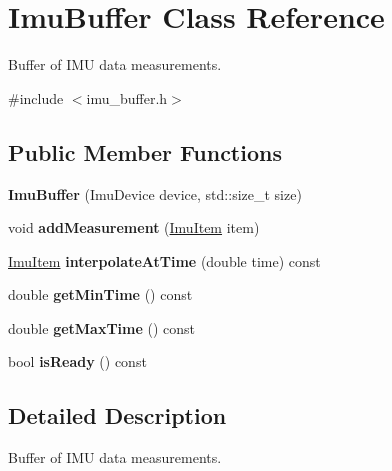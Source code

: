 \hypertarget{class_imu_buffer}{\section{Imu\-Buffer Class Reference}
\label{class_imu_buffer}
}


Buffer of I\-M\-U data measurements.  




{\ttfamily \#include $<$imu\-\_\-buffer.\-h$>$}

\subsection*{Public Member Functions}
\begin{DoxyCompactItemize}
\item 
\hypertarget{class_imu_buffer_a50dd06412b4e7f3f041ae6ab6fa680b0}{{\bfseries Imu\-Buffer} (Imu\-Device device, std\-::size\-\_\-t size)}\label{class_imu_buffer_a50dd06412b4e7f3f041ae6ab6fa680b0}

\item 
\hypertarget{class_imu_buffer_a03aff5b4ab113232a3fa032115249018}{void {\bfseries add\-Measurement} (\hyperlink{class_imu_item}{Imu\-Item} item)}\label{class_imu_buffer_a03aff5b4ab113232a3fa032115249018}

\item 
\hypertarget{class_imu_buffer_a70e3b571c1ff9c9e2ca60c8dfd1eee1c}{\hyperlink{class_imu_item}{Imu\-Item} {\bfseries interpolate\-At\-Time} (double time) const }\label{class_imu_buffer_a70e3b571c1ff9c9e2ca60c8dfd1eee1c}

\item 
\hypertarget{class_imu_buffer_a3c23315625f26a5673b814f513c1bc98}{double {\bfseries get\-Min\-Time} () const }\label{class_imu_buffer_a3c23315625f26a5673b814f513c1bc98}

\item 
\hypertarget{class_imu_buffer_aa3f3a11dc21d97386b3154122cb8e296}{double {\bfseries get\-Max\-Time} () const }\label{class_imu_buffer_aa3f3a11dc21d97386b3154122cb8e296}

\item 
\hypertarget{class_imu_buffer_a4500c72f04ac02e629e77762953c6abc}{bool {\bfseries is\-Ready} () const }\label{class_imu_buffer_a4500c72f04ac02e629e77762953c6abc}

\end{DoxyCompactItemize}


\subsection{Detailed Description}
Buffer of I\-M\-U data measurements. 

